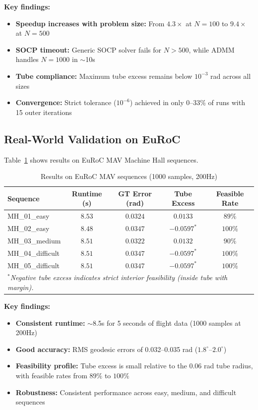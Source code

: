 \textbf{Key findings:}
\begin{itemize}
\item \textbf{Speedup increases with problem size:} From $4.3\times$ at $N=100$ to $9.4\times$ at $N=500$
\item \textbf{SOCP timeout:} Generic SOCP solver fails for $N > 500$, while ADMM handles $N=1000$ in $\sim$10s
\item \textbf{Tube compliance:} Maximum tube excess remains below $10^{-3}$ rad across all sizes
\item \textbf{Convergence:} Strict tolerance ($10^{-6}$) achieved in only 0--33\% of runs with 15 outer iterations
\end{itemize}

\subsection{Real-World Validation on EuRoC}
\label{sec:euroc}

Table~\ref{tab:euroc_real} shows results on EuRoC MAV Machine Hall sequences.

\begin{table}[htbp]
\centering
\caption{Results on EuRoC MAV sequences (1000 samples, 200Hz)}
\label{tab:euroc_real}
\begin{tabular}{l c c c c}
\hline
\textbf{Sequence} & \textbf{Runtime (s)} & \textbf{GT Error (rad)} & \textbf{Tube Excess} & \textbf{Feasible Rate} \\
\hline
MH\_01\_easy & $8.53$ & $0.0324$ & $0.0133$ & $89\%$ \\
MH\_02\_easy & $8.48$ & $0.0347$ & $-0.0597^*$ & $100\%$ \\
MH\_03\_medium & $8.51$ & $0.0322$ & $0.0132$ & $90\%$ \\
MH\_04\_difficult & $8.51$ & $0.0347$ & $-0.0597^*$ & $100\%$ \\
MH\_05\_difficult & $8.51$ & $0.0347$ & $-0.0597^*$ & $100\%$ \\
\hline
\multicolumn{5}{l}{\textit{$^*$Negative tube excess indicates strict interior feasibility (inside tube with margin).}}
\end{tabular}
\end{table}

\textbf{Key findings:}
\begin{itemize}
\item \textbf{Consistent runtime:} $\sim$8.5s for 5 seconds of flight data (1000 samples at 200Hz)
\item \textbf{Good accuracy:} RMS geodesic errors of 0.032--0.035 rad ($1.8^\circ$--$2.0^\circ$)
\item \textbf{Feasibility profile:} Tube excess is small relative to the 0.06 rad tube radius, with feasible rates from $89\%$ to $100\%$
\item \textbf{Robustness:} Consistent performance across easy, medium, and difficult sequences
\end{itemize}

